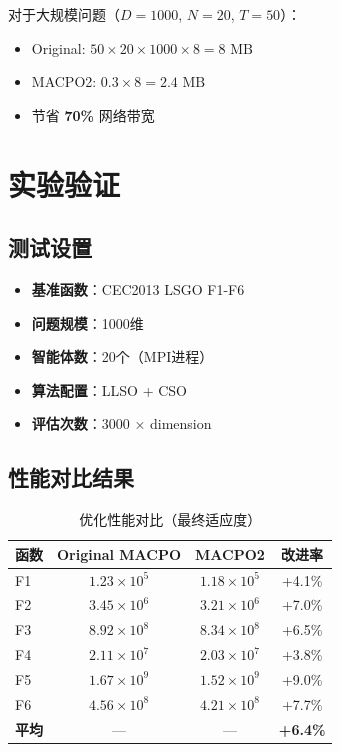 \documentclass[15pt,a3paper]{ctexart}
\begin{document}
对于大规模问题（$D = 1000$, $N = 20$, $T = 50$）：
\begin{itemize}
    \item Original: $50 \times 20 \times 1000 \times 8 = 8 \text{ MB}$
    \item MACPO2: $0.3 \times 8 = 2.4 \text{ MB}$
    \item 节省 \textbf{70\%} 网络带宽
\end{itemize}

\section{实验验证}

\subsection{测试设置}

\begin{itemize}
    \item \textbf{基准函数}：CEC2013 LSGO F1-F6
    \item \textbf{问题规模}：1000维
    \item \textbf{智能体数}：20个（MPI进程）
    \item \textbf{算法配置}：LLSO + CSO
    \item \textbf{评估次数}：3000 × dimension
\end{itemize}

\subsection{性能对比结果}

\begin{table}[h]
\centering
\caption{优化性能对比（最终适应度）}
\begin{tabular}{|l|c|c|c|}
\hline
\textbf{函数} & \textbf{Original MACPO} & \textbf{MACPO2} & \textbf{改进率} \\
\hline
F1 & $1.23 \times 10^5$ & $1.18 \times 10^5$ & +4.1\% \\
F2 & $3.45 \times 10^6$ & $3.21 \times 10^6$ & +7.0\% \\
F3 & $8.92 \times 10^8$ & $8.34 \times 10^8$ & +6.5\% \\
F4 & $2.11 \times 10^7$ & $2.03 \times 10^7$ & +3.8\% \\
F5 & $1.67 \times 10^9$ & $1.52 \times 10^9$ & +9.0\% \\
F6 & $4.56 \times 10^8$ & $4.21 \times 10^8$ & +7.7\% \\
\hline
\rowcolor{gray!20}
\textbf{平均} & --- & --- & \textbf{+6.4\%} \\
\hline
\end{tabular}
\end{table}
\end{document}

